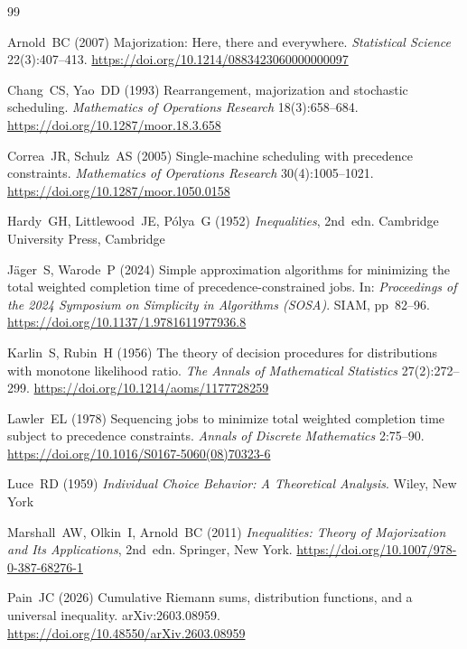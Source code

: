 \documentclass[pdflatex,iicol,sn-basic]{sn-jnl}
\theoremstyle{thmstyleone}
\theoremstyle{thmstyletwo}
\theoremstyle{thmstylethree}
\begin{document}
\begingroup
\setlength{\bibsep}{0.5em}
\begin{thebibliography}{99}
\raggedright

Arnold~BC (2007) Majorization: Here, there and everywhere.
\emph{Statistical Science} 22(3):407--413.
\url{https://doi.org/10.1214/0883423060000000097}

Chang~CS, Yao~DD (1993) Rearrangement, majorization and stochastic scheduling.
\emph{Mathematics of Operations Research} 18(3):658--684.
\url{https://doi.org/10.1287/moor.18.3.658}

Correa~JR, Schulz~AS (2005) Single-machine scheduling with precedence
constraints.
\emph{Mathematics of Operations Research} 30(4):1005--1021.
\url{https://doi.org/10.1287/moor.1050.0158}

Hardy~GH, Littlewood~JE, P\'olya~G (1952) \emph{Inequalities}, 2nd~edn.
Cambridge University Press, Cambridge

J\"ager~S, Warode~P (2024) Simple approximation algorithms for minimizing the
total weighted completion time of precedence-constrained jobs.
In: \emph{Proceedings of the 2024 Symposium on Simplicity in Algorithms (SOSA)}.
SIAM, pp~82--96.
\url{https://doi.org/10.1137/1.9781611977936.8}

Karlin~S, Rubin~H (1956) The theory of decision procedures for distributions
with monotone likelihood ratio.
\emph{The Annals of Mathematical Statistics} 27(2):272--299.
\url{https://doi.org/10.1214/aoms/1177728259}

Lawler~EL (1978) Sequencing jobs to minimize total weighted completion time
subject to precedence constraints.
\emph{Annals of Discrete Mathematics} 2:75--90.
\url{https://doi.org/10.1016/S0167-5060(08)70323-6}

Luce~RD (1959) \emph{Individual Choice Behavior: A Theoretical Analysis}.
Wiley, New York

Marshall~AW, Olkin~I, Arnold~BC (2011) \emph{Inequalities: Theory of
Majorization and Its Applications}, 2nd~edn.
Springer, New York.
\url{https://doi.org/10.1007/978-0-387-68276-1}

Pain~JC (2026) Cumulative Riemann sums, distribution functions, and a universal
inequality. arXiv:2603.08959.
\url{https://doi.org/10.48550/arXiv.2603.08959}


\end{thebibliography}
\end{document}

